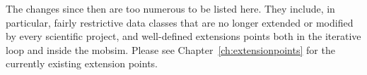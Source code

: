The changes since then are too numerous to be listed here.  They include, in particular, fairly restrictive data classes that are no longer extended or modified by every scientific project, and well-defined extensions points both in the iterative loop and inside the \gls{mobsim}.  Please see Chapter~\ref{ch:extensionpoints} for the currently existing extension points.


